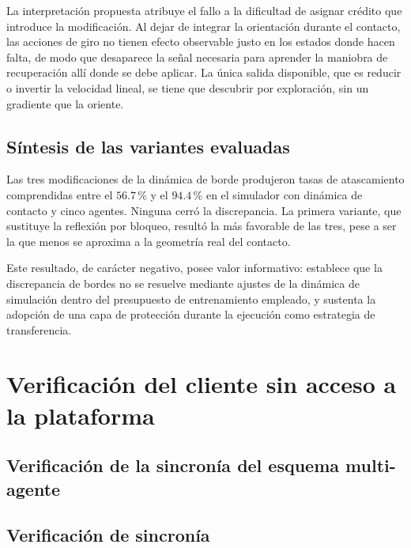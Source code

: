 La interpretación propuesta atribuye el fallo a la dificultad de asignar crédito que introduce la modificación. Al dejar de integrar la orientación durante el contacto, las acciones de giro no tienen efecto observable justo en los estados donde hacen falta, de modo que desaparece la señal necesaria para aprender la maniobra de recuperación allí donde se debe aplicar. La única salida disponible, que es reducir o invertir la velocidad lineal, se tiene que descubrir por exploración, sin un gradiente que la oriente.

\subsection*{Síntesis de las variantes evaluadas}

Las tres modificaciones de la dinámica de borde produjeron tasas de
atascamiento comprendidas entre el $56{.}7$\,\% y el $94{.}4$\,\% en el
simulador con dinámica de contacto y cinco agentes. Ninguna cerró la
discrepancia. La primera variante, que sustituye la reflexión por bloqueo,
resultó la más favorable de las tres, pese a ser la que menos se aproxima a la
geometría real del contacto.

Este resultado, de carácter negativo, posee valor informativo: establece que
la discrepancia de bordes no se resuelve mediante ajustes de la dinámica de
simulación dentro del presupuesto de entrenamiento empleado, y sustenta la
adopción de una capa de protección durante la ejecución como estrategia de
transferencia.


\section{Verificación del cliente sin acceso a la plataforma}
\label{anx:verificacion}

\subsection*{Verificación de la sincronía del esquema multi-agente}

\subsection*{Verificación de sincronía}

